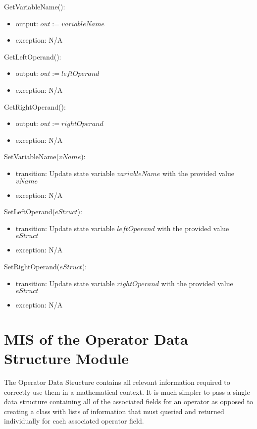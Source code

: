 \documentclass[12pt, titlepage]{article}
\begin{document}
\noindent GetVariableName():
\begin{itemize}
	\item output: $out := variableName$
	\item exception: N/A
\end{itemize}

\noindent GetLeftOperand():
\begin{itemize}
	\item output: $out := leftOperand$
	\item exception: N/A
\end{itemize}

\noindent GetRightOperand():
\begin{itemize}
	\item output: $out := rightOperand$
	\item exception: N/A
\end{itemize}

\noindent SetVariableName($vName$):
\begin{itemize}
	\item transition: Update state variable $variableName$ with the provided 
	value $vName$
	\item exception: N/A
\end{itemize}

\noindent SetLeftOperand($eStruct$):
\begin{itemize}
	\item transition: Update state variable $leftOperand$ with the provided 
	value $eStruct$
	\item exception: N/A
\end{itemize}

\noindent SetRightOperand($eStruct$):
\begin{itemize}
	\item transition: Update state variable $rightOperand$ with the provided 
	value $eStruct$
	\item exception: N/A
\end{itemize}

\newpage

\section{MIS of the Operator Data Structure Module} 
\label{Module_operatordatastructure}
The Operator Data Structure contains all relevant information required to 
correctly use them in a mathematical context. It is much simpler to pass a 
single data structure containing all of the associated fields for an operator 
as opposed to creating a class with lists of information that must queried and 
returned individually for each associated operator field.
\end{document}
